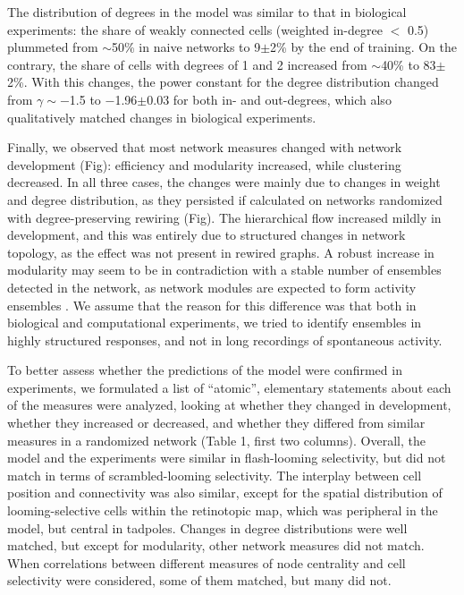 \documentclass{article}
\begin{document}
The distribution of degrees in the model was similar to that in biological experiments: the share of weakly connected cells (weighted in-degree $<$ 0.5) plummeted from $\sim$50\% in naive networks to 9$\pm$2\% by the end of training. On the contrary, the share of cells with degrees of 1 and 2 increased from $\sim$40\% to 83$\pm$2\%. With this changes, the power constant for the degree distribution changed from $\gamma \sim -$1.5 to $-$1.96$\pm$0.03 for both in- and out-degrees, which also qualitatively matched changes in biological experiments.

Finally, we observed that most network measures changed with network development (Fig): efficiency and modularity increased, while clustering decreased. In all three cases, the changes were mainly due to changes in weight and degree distribution, as they persisted if calculated on networks randomized with degree-preserving rewiring (Fig). The hierarchical flow increased mildly in development, and this was entirely due to structured changes in network topology, as the effect was not present in rewired graphs. A robust increase in modularity may seem to be in contradiction with a stable number of ensembles detected in the network, as network modules are expected to form activity ensembles \citep{triplett2018emergence}. We assume that the reason for this difference was that both in biological and computational experiments, we tried to identify ensembles in highly structured responses, and not in long recordings of spontaneous activity.

To better assess whether the predictions of the model were confirmed in experiments, we formulated a list of “atomic”, elementary statements about each of the measures were analyzed, looking at whether they changed in development, whether they increased or decreased, and whether they differed from similar measures in a randomized network (Table 1, first two columns). Overall, the model and the experiments were similar in flash-looming selectivity, but did not match in terms of scrambled-looming selectivity. The interplay between cell position and connectivity was also similar, except for the spatial distribution of looming-selective cells within the retinotopic map, which was peripheral in the model, but central in tadpoles. Changes in degree distributions were well matched, but except for modularity, other network measures did not match. When correlations between different measures of node centrality and cell selectivity were considered, some of them matched, but many did not.
\end{document}

